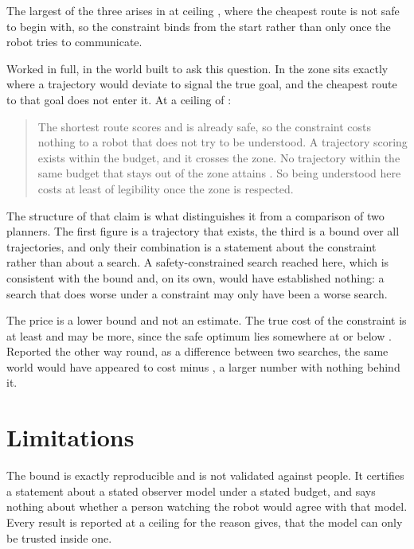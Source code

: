 \documentclass[journal]{IEEEtran}
\begin{document}


The largest of the three arises in \safetyLargestWorld{} at ceiling
\safetyLargestCeiling{}, where the cheapest route is not safe to begin with, so
the constraint binds from the start rather than only once the robot tries to
communicate.

Worked in full, in the world built to ask this question. In \safetyWorld{} the
zone sits exactly where a trajectory would deviate to signal the true goal, and
the cheapest route to that goal does not enter it. At a ceiling of
\safetyCeiling{}:

\begin{quote}
The shortest route scores \safetyShortest{} and is already safe, so the
constraint costs nothing to a robot that does not try to be understood. A
trajectory scoring \safetyFree{} exists within the budget, and it crosses the
zone. No trajectory within the same budget that stays out of the zone attains
\safetySafeBound{}. So being understood here costs at least \safetyPrice{} of
legibility once the zone is respected.
\end{quote}

\noindent The structure of that claim is what distinguishes it from a
comparison of two planners. The first figure is a trajectory that exists, the
third is a bound over all trajectories, and only their combination is a
statement about the constraint rather than about a search. A safety-constrained
search reached \safetySafeAchieved{} here, which is consistent with the bound
and, on its own, would have established nothing: a search that does worse under
a constraint may only have been a worse search.

The price is a lower bound and not an estimate. The true cost of the constraint
is at least \safetyPrice{} and may be more, since the safe optimum lies
somewhere at or below \safetySafeBound{}. Reported the other way round, as a
difference between two searches, the same world would have appeared to cost
\safetyFree{} minus \safetySafeAchieved{}, a larger number with nothing behind
it.

\section{Limitations}
\label{sec:limitations}

The bound is exactly reproducible and is not validated against people. It
certifies a statement about a stated observer model under a stated budget, and
says nothing about whether a person watching the robot would agree with that
model. Every result is reported at a ceiling for the reason
\cite{dragan2013generating} gives, that the model can only be trusted inside
one.
\end{document}
